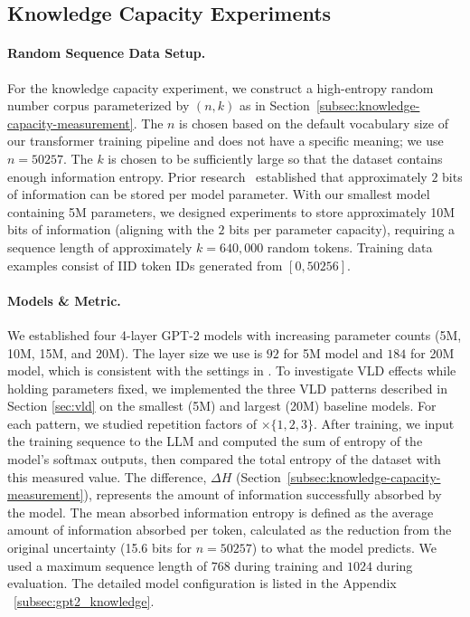 \documentclass{article} %
\begin{document}
\subsection{Knowledge Capacity Experiments}

\paragraph{Random Sequence Data Setup.}
For the knowledge capacity experiment, we construct a high-entropy random number corpus parameterized by $(n,k)$ as in Section~\ref{subsec:knowledge-capacity-measurement}. The $n$ is chosen based on the default vocabulary size of our transformer training pipeline and does not have a specific meaning; we use $n = 50257$. The $k$ is chosen to be sufficiently large so that the dataset contains enough information entropy. Prior research~\citep{allen2024physics} established that approximately $2$ bits of information can be stored per model parameter. With our smallest model containing 5M parameters, we designed experiments to store approximately 10M bits of information (aligning with the $2$ bits per parameter capacity), requiring a sequence length of approximately $k = 640{,}000$ random tokens. Training data examples consist of IID token IDs generated from $[0, 50256]$. 


\paragraph{Models \& Metric.}
We established four 4-layer GPT-2 models with increasing parameter counts (5M, 10M, 15M, and 20M). The layer size we use is $92$ for 5M model and $184$ for 20M model, which is consistent with the settings in \citep{allen2024physics}. To investigate VLD effects while holding parameters fixed, we implemented the three VLD patterns described in Section \ref{sec:vld} on the smallest (5M) and largest (20M) baseline models. For each pattern, we studied repetition factors of $\times\{1,2,3\}$. After training, we input the training sequence to the LLM and computed the sum of entropy of the model's softmax outputs, then compared the total entropy of the dataset with this measured value. The difference, $\Delta H$ (Section~\ref{subsec:knowledge-capacity-measurement}), represents the amount of information successfully absorbed by the model. The mean absorbed information entropy is defined as the average amount of information absorbed per token, calculated as the reduction from the original uncertainty (15.6 bits for $n = 50257$) to what the model predicts. We used a maximum sequence length of $768$ during training and $1024$ during evaluation. The detailed model configuration is listed in the Appendix ~\ref{subsec:gpt2_knowledge}.
\end{document}
